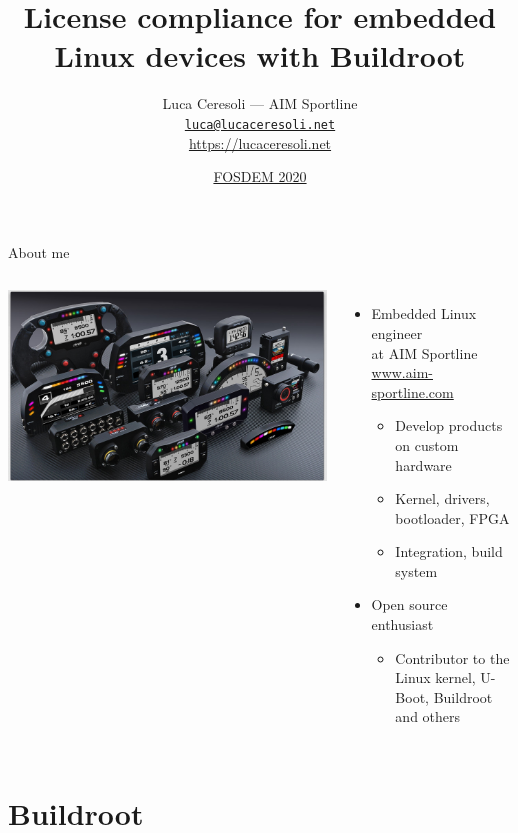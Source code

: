 \documentclass[xetex,table,table]{beamer}
\title{License compliance for embedded Linux devices with Buildroot}
\author{Luca Ceresoli --- AIM Sportline\\
  \href{mailto:luca@lucaceresoli.net}{\tt luca@lucaceresoli.net}\\
  \url{https://lucaceresoli.net}
}
\date{\href{https://fosdem.org/2020/schedule/event/buildroot_license_compliance/}{FOSDEM 2020}}
\begin{document}
\maketitle

\begin{frame}{About me}
  \begin{columns}
    \includegraphics[width=\textwidth]{../common/images/aim-products.jpg}

    \begin{itemize}
    \item Embedded Linux engineer\\
      at AIM Sportline\\
      {\footnotesize\href{https://www.aim-sportline.com/}{www.aim-sportline.com}}
      \begin{itemize}
      \item Develop products on custom hardware
      \item Kernel, drivers, bootloader, FPGA
      \item Integration, build system
      \end{itemize}
    \item Open source enthusiast
      \begin{itemize}
      \item Contributor to the Linux kernel, U-Boot, Buildroot and others
      \end{itemize}
    \end{itemize}
  \end{columns}
\end{frame}


\section{Buildroot}
\end{document}
